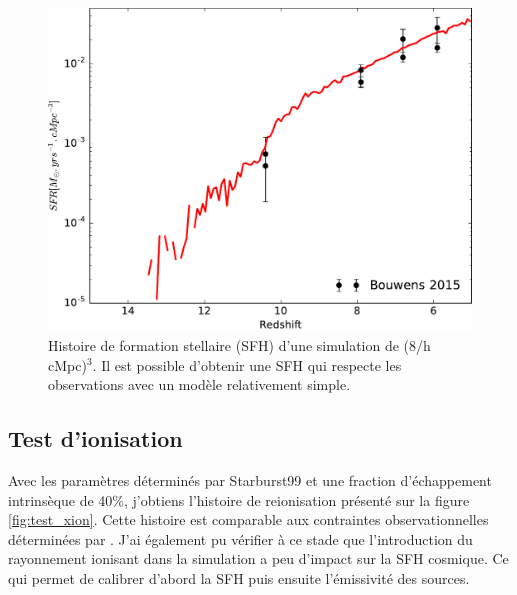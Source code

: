 \begin{figure}
        \includegraphics[width=.95\linewidth]{img/02/SFR.pdf}
        \caption[Histoire de formation stellaire]{Histoire de formation stellaire (SFH) d'une simulation de (8/h cMpc)$^3$.
        Il est possible d'obtenir une SFH qui respecte les observations avec un modèle relativement simple.
}
 		\label{fig:test_SFH}
\end{figure}

\subsection{Test d'ionisation}
Avec les paramètres déterminés par Starburst99 et une fraction d'échappement intrinsèque de 40\%, j'obtiens l'histoire de reionisation présenté sur la figure \ref{fig:test_xion}.
Cette histoire est comparable aux contraintes observationnelles déterminées par \cite{fan_constraining_2006}.
J'ai également pu vérifier à ce stade que l'introduction du rayonnement ionisant dans la simulation a peu d'impact sur la \ac{SFH} cosmique.
Ce qui permet de calibrer d'abord la \ac{SFH} puis ensuite l'émissivité des sources.

